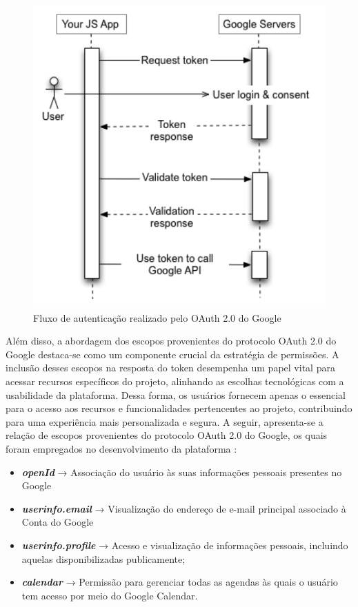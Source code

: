 \begin{figure}[!ht] %
    \centering
    \includegraphics[scale=0.5]{latex/figuras/oauth.pdf}
    \caption[Fluxo de Autenticação OAuth 2.0 do Google]
    {Fluxo de autenticação realizado pelo OAuth 2.0 do Google}
\end{figure}

Além disso, a abordagem dos escopos provenientes do protocolo OAuth 2.0 do Google destaca-se como um componente crucial da estratégia de permissões. A inclusão desses escopos na resposta do token desempenha um papel vital para acessar recursos específicos do projeto, alinhando as escolhas tecnológicas com a usabilidade da plataforma. Dessa forma, os usuários fornecem apenas o essencial para o acesso aos recursos e funcionalidades pertencentes ao projeto, contribuindo para uma experiência mais personalizada e segura. A seguir, apresenta-se a relação de escopos provenientes do protocolo OAuth 2.0 do Google, os quais foram empregados no desenvolvimento da plataforma \cite{OAUTHSCOPES}:

\begin{itemize}
\item \textit{\textbf{openId}} → Associação do usuário às suas informações pessoais presentes no Google

\item \textit{\textbf{userinfo.email}} → Visualização do endereço de e-mail principal associado à Conta do Google

\item \textit{\textbf{userinfo.profile}} → Acesso e visualização de informações pessoais, incluindo aquelas disponibilizadas publicamente;
\item \textit{\textbf{calendar}} → Permissão para gerenciar todas as agendas às quais o usuário tem acesso por meio do Google Calendar.
\end{itemize}


